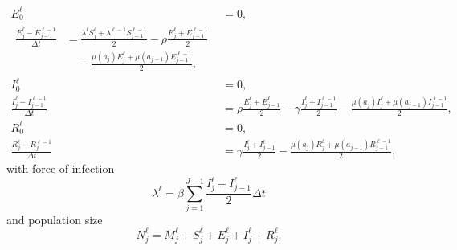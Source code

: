 \documentclass{jpmarticle}
\let\subequationsorig\subequations%
\let\endsubequationsorig\endsubequations%
\renewenvironment{subequations}{
  \subequationsorig
  \renewcommand{\theequation}{\theparentequation.\arabic{equation}}
}{
  \endsubequationsorig
}
\begin{document}
\begin{subequations}
\begin{align}
    E_0^{\ell} &= 0,
    \\
    \begin{split}
      \frac{E_j^{\ell} - E_{j - 1}^{\ell - 1}}{\Delta t} &=
      \frac{\lambda^{\ell} S_j^{\ell} + \lambda^{\ell - 1} S_{j - 1}^{\ell - 1}}{2}
      - \rho \frac{E_j^{\ell} + E_{j - 1}^{\ell - 1}}{2}
      \\ & \quad {}
      - \frac{\mu(a_j) E_j^{\ell} + \mu(a_{j - 1}) E_{j - 1}^{\ell - 1}}{2},
    \end{split}
    \\
    I_0^{\ell} &= 0,
    \\
    \frac{I_j^{\ell} - I_{j - 1}^{\ell - 1}}{\Delta t} &=
    \rho \frac{E_j^{\ell} + E_{j - 1}^{\ell}}{2}
    - \gamma \frac{I_j^{\ell} + I_{j - 1}^{\ell - 1}}{2}
    - \frac{\mu(a_j) I_j^{\ell} + \mu(a_{j - 1}) I_{j - 1}^{\ell - 1}}{2},
    \\
    R_0^{\ell} &= 0,
    \\
    \frac{R_j^{\ell} - R_j^{\ell - 1}}{\Delta t} &=
    \gamma \frac{I_j^{\ell} + I_{j - 1}^{\ell}}{2}
    - \frac{\mu(a_j) R_j^{\ell} + \mu(a_{j - 1}) R_{j - 1}^{\ell - 1}}{2},
  \end{align}
  with force of infection
  \begin{equation}
    \lambda^{\ell} =
    \beta \sum_{j = 1}^{J - 1}
    \frac{I_j^{\ell} + I_{j - 1}^{\ell}}{2}
    \Delta t
  \end{equation}
  and population size
  \begin{equation}
    N_j^{\ell} =
    M_j^{\ell} + S_j^{\ell} + E_j^{\ell} + I_j^{\ell} + R_j^{\ell}.
  \end{equation}
\end{subequations}
\end{document}
